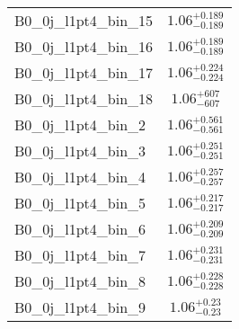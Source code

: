 \begin{tabular}{|l|c|}
B0\_0j\_l1pt4\_bin\_15 & $1.06^{+0.189}_{-0.189}$ \\
B0\_0j\_l1pt4\_bin\_16 & $1.06^{+0.189}_{-0.189}$ \\
B0\_0j\_l1pt4\_bin\_17 & $1.06^{+0.224}_{-0.224}$ \\
B0\_0j\_l1pt4\_bin\_18 & $1.06^{+607}_{-607}$ \\
B0\_0j\_l1pt4\_bin\_2 & $1.06^{+0.561}_{-0.561}$ \\
B0\_0j\_l1pt4\_bin\_3 & $1.06^{+0.251}_{-0.251}$ \\
B0\_0j\_l1pt4\_bin\_4 & $1.06^{+0.257}_{-0.257}$ \\
B0\_0j\_l1pt4\_bin\_5 & $1.06^{+0.217}_{-0.217}$ \\
B0\_0j\_l1pt4\_bin\_6 & $1.06^{+0.209}_{-0.209}$ \\
B0\_0j\_l1pt4\_bin\_7 & $1.06^{+0.231}_{-0.231}$ \\
B0\_0j\_l1pt4\_bin\_8 & $1.06^{+0.228}_{-0.228}$ \\
B0\_0j\_l1pt4\_bin\_9 & $1.06^{+0.23}_{-0.23}$ \\
\hline
\end{tabular}
